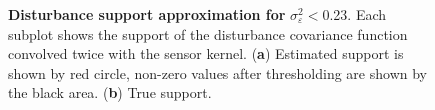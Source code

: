 \documentclass[]{article}
\begin{document}
\begin{figure}[!ht]
\begin{center}
\end{center}
\caption{{\bf Disturbance support approximation for }$\sigma_{\varepsilon}^2<$0.23. Each subplot shows the support of the disturbance covariance function convolved twice with the sensor kernel. (\textbf{a}) Estimated support is shown by red circle, non-zero values after thresholding are shown by the black area. (\textbf{b}) True support.}
\label{fig:BinaryDisturbanceWidthEstimation}
\end{figure}
\end{document}
